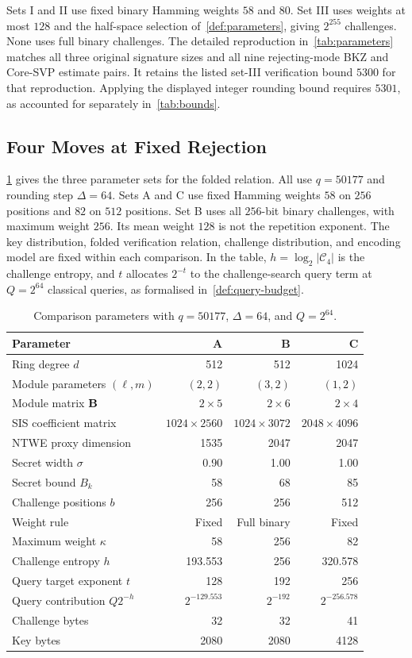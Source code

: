 Sets I and II use fixed binary Hamming weights $58$ and $80$. Set III uses weights at most $128$ and the half-space selection of~\cref{def:parameters}, giving $2^{255}$ challenges. None uses full binary challenges. The detailed reproduction in~\cref{tab:parameters} matches all three original signature sizes and all nine rejecting-mode BKZ and Core-SVP estimate pairs. It retains the listed set-III verification bound $5300$ for that reproduction. Applying the displayed integer rounding bound requires $5301$, as accounted for separately in~\cref{tab:bounds}.

\subsection{Four Moves at Fixed Rejection}

\cref{tab:four-parameters} gives the three parameter sets for the folded relation. All use $q=50177$ and rounding step $\Delta=64$. Sets A and C use fixed Hamming weights $58$ on $256$ positions and $82$ on $512$ positions. Set B uses all $256$-bit binary challenges, with maximum weight $256$. Its mean weight $128$ is not the repetition exponent. The key distribution, folded verification relation, challenge distribution, and encoding model are fixed within each comparison. In the table, $h=\log_2|\mathcal C_4|$ is the challenge entropy, and $t$ allocates $2^{-t}$ to the challenge-search query term at $Q=2^{64}$ classical queries, as formalised in~\cref{def:query-budget}.
\begin{table}[!htbp]
\centering
\begin{tabular}{lrrr}
\toprule
Parameter & A & B & C\\
\midrule
Ring degree $d$ & 512 & 512 & 1024\\
Module parameters $(\ell,m)$ & $(2,2)$ & $(3,2)$ & $(1,2)$\\
Module matrix $\mathbf{B}$ & $2\times5$ & $2\times6$ & $2\times4$\\
SIS coefficient matrix & $1024\times2560$ & $1024\times3072$ & $2048\times4096$\\
NTWE proxy dimension & 1535 & 2047 & 2047\\
Secret width $\sigma$ & 0.90 & 1.00 & 1.00\\
Secret bound $B_k$ & 58 & 68 & 85\\
Challenge positions $b$ & 256 & 256 & 512\\
Weight rule & Fixed & Full binary & Fixed\\
Maximum weight $\kappa$ & 58 & 256 & 82\\
Challenge entropy $h$ & 193.553 & 256 & 320.578\\
Query target exponent $t$ & 128 & 192 & 256\\
Query contribution $Q2^{-h}$ & $2^{-129.553}$ & $2^{-192}$ & $2^{-256.578}$\\
Challenge bytes & 32 & 32 & 41\\
Key bytes & 2080 & 2080 & 4128\\
\bottomrule
\end{tabular}
\caption{Comparison parameters with $q=50177$, $\Delta=64$, and $Q=2^{64}$.}
\label{tab:four-parameters}
\end{table}

